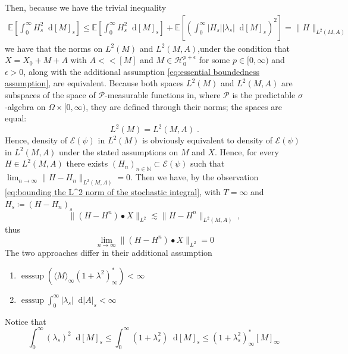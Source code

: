 \documentclass[11pt]{report}
\newcommand{\diff}{\mathop{}\!\mathrm{d}}
\theoremstyle{plain} %
\theoremstyle{definition} %
\theoremstyle{remark} %
\begin{document}
Then, because we have the trivial inequality
\begin{align}\label{eq:essential boundedness assumption}
    \mathbb{E}[\int_0^{\infty}H_s^2\diff[M]_s]\leq  \mathbb{E}[\int_0^{\infty}H_s^2\diff[M]_s]+  \mathbb{E}[\left(\int_0^{\infty}|H_s||\lambda_s|\diff[M]_s\right)^2]=\lVert H\rVert_{L^2(M,A)}
\end{align}
we have that the norms on \(L^2(M)\) and \(L^2(M,A)\),under the condition that \(X = X_0+M+A\) with \(A<<[M]\) and \(M\in\mathcal{H}^{p+\epsilon}_0\) for some \(p\in[0,\infty)\) and \(\epsilon>0\), along with the additional assumption \cref{eq:essential boundedness assumption}, are equivalent. Because both spaces \(L^2(M)\) and \(L^2(M,A)\) are subspaces of the space of \(\mathcal
P\)-measurable functions in, where \(\mathcal{P}\) is the predictable \(\sigma\)-algebra on \(\Omega\times[0,\infty)\), they are defined through their norms; the spaces are equal:
\begin{equation}
    L^2(M) =L^2(M,A)\;.
\end{equation}
Hence, density of \(\mathcal{E}(\psi)\) in \(L^2(M)\) is obviously equivalent to density of \(\mathcal{E}(\psi)\) in \(L^2(M,A)\) under the stated assumptions on \(M\) and \(X\). Hence, for every \(H\in L^2(M,A)\) there exists \((H_n)_{n\in\mathbb{N}}\subset \mathcal{E}(\psi)\) such that \(\lim_{n\to\infty}\lVert H-H_n\rVert_{L^2(M,A)}=0\). Then we have, by the observation \cref{eq:bounding the L^2 norm of the stochastic integral}, with \(T=\infty\) and \(H_s\coloneqq (H-H_n)_s\)
\begin{equation}
    \lVert (H-H^n)\bullet X\rVert_{L^2}
    \lesssim\lVert H-H^n\rVert_{L^2(M,A)}\;,
\end{equation}
thus
\begin{equation}
    \lim_{n\to\infty}\lVert (H-H^n)\bullet X\rVert_{L^2}=0
\end{equation}
\bigbreak
The two approaches differ in their additional assumption
\begin{enumerate}
    \item \(\operatorname*{ess\sup}(\langle M\rangle_{\infty}(1+\lambda^2)^{*}_{\infty})<\infty\)
    \item  \(\operatorname*{ess\sup}\int_0^{\infty}|\lambda_s|\diff |A|_s<\infty\)
\end{enumerate}
Notice that
\begin{equation}
    \int_0^\infty(\lambda_s)^2\diff [M]_s\leq\int_0^{\infty}(1+\lambda_s^2)\diff[M]_s\leq(1+\lambda_s^2)_{\infty}^*[M]_{\infty}\,
\end{equation}
\end{document}
